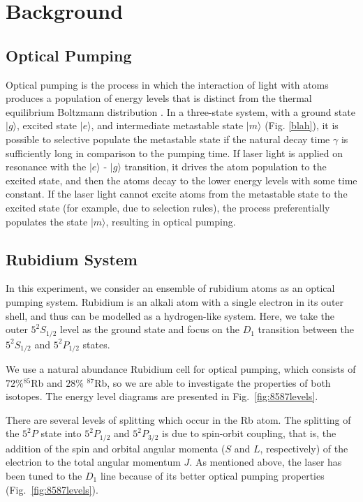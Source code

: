 
\section{Background}\label{background}

\subsection{Optical Pumping}

Optical pumping is the process in which the interaction of light with
atoms produces a population of energy levels that is distinct from the
thermal equilibrium Boltzmann distribution \cite{bernheim}. In a
three-state system, with a ground state $|g\rangle$, excited state
$|e\rangle$, and intermediate metastable state $|m\rangle$
(Fig. \ref{blah}), it is possible to selective populate the metastable
state if the natural decay time $\gamma$ is sufficiently long in
comparison to the pumping time. If laser light is applied on resonance
with the $|e\rangle$ - $|g\rangle$ transition, it drives the atom
population to the excited state, and then the atoms decay to the lower
energy levels with some time constant. If the laser light cannot
excite atoms from the metastable state to the excited state (for
example, due to selection rules), the process preferentially populates
the state $|m\rangle$, resulting in optical pumping.


\subsection{Rubidium System}

In this experiment, we consider an ensemble of rubidium atoms as an
optical pumping system. Rubidium is an alkali atom with a single
electron in its outer shell, and thus can be modelled as a
hydrogen-like system. Here, we take the outer $5^2S_{1/2}$ level as
the ground state and focus on the $D_1$ transition between the
$5^2S_{1/2}$ and $5^2P_{1/2}$ states. 

We use a natural abundance Rubidium cell for optical pumping, which
consists of $72\%$$^{85}$Rb and $28\%$ $^{87}$Rb, so we are able to
investigate the properties of both isotopes. The energy level diagrams
are presented in Fig.~\ref{fig:8587levels}.

There are several levels of splitting which occur in the Rb atom. The
splitting of the $5^2P$ state into $5^2P_{1/2}$ and $5^2P_{3/2}$ is
due to spin-orbit coupling, that is, the addition of the spin and
orbital angular momenta ($S$ and $L$, respectively) of the electrion
to the total angular momentum $J$. As mentioned above, the laser has
been tuned to the $D_1$ line because of its better optical pumping
properties (Fig.~\ref{fig:8587levels}).

